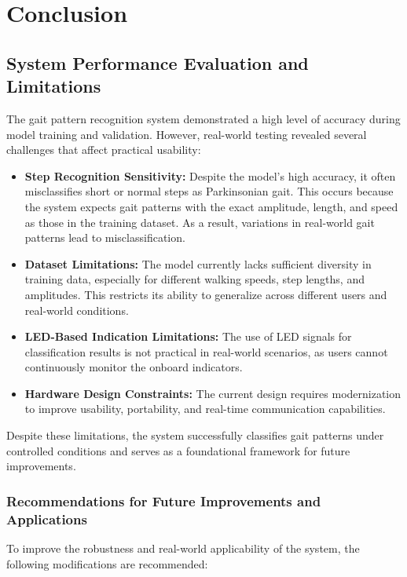 \chapter{Conclusion}
\section{System Performance Evaluation and Limitations}
The gait pattern recognition system demonstrated a high level of accuracy during model training and validation. However, real-world testing revealed several challenges that affect practical usability:

\begin{itemize}
    \item \textbf{Step Recognition Sensitivity:} Despite the model's high accuracy, it often misclassifies short or normal steps as Parkinsonian gait. This occurs because the system expects gait patterns with the exact amplitude, length, and speed as those in the training dataset. As a result, variations in real-world gait patterns lead to misclassification.
    
    \item \textbf{Dataset Limitations:} The model currently lacks sufficient diversity in training data, especially for different walking speeds, step lengths, and amplitudes. This restricts its ability to generalize across different users and real-world conditions.
    
    \item \textbf{LED-Based Indication Limitations:} The use of LED signals for classification results is not practical in real-world scenarios, as users cannot continuously monitor the onboard indicators.
    
    \item \textbf{Hardware Design Constraints:} The current design requires modernization to improve usability, portability, and real-time communication capabilities.
\end{itemize}

Despite these limitations, the system successfully classifies gait patterns under controlled conditions and serves as a foundational framework for future improvements.

\subsection{Recommendations for Future Improvements and Applications}
To improve the robustness and real-world applicability of the system, the following modifications are recommended:

